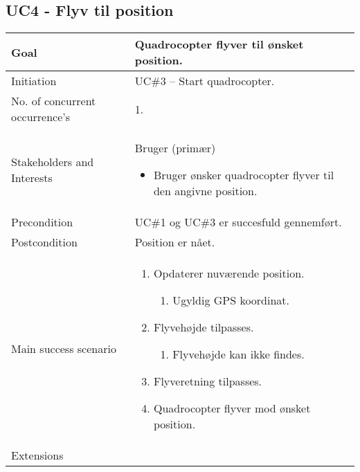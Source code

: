 \subsection*{UC4 - Flyv til position}

\begin{table}[H]
\begin{tabular}{|l|p{10cm}|}
\hline

Goal	 								& Quadrocopter flyver til ønsket position. \\\hline
Initiation 							& UC\#3 – Start quadrocopter. \\\hline
No. of concurrent occurrence’s		& 1. \\\hline
Stakeholders	and Interests			& Bruger (primær) 
										\begin{itemize}
											\item Bruger ønsker quadrocopter flyver til den angivne position.
										\end{itemize} \\\hline
Precondition							& UC\#1 og UC\#3 er succesfuld gennemført. \\\hline
Postcondition						& Position er nået. \\\hline
Main success scenario				&
 
									\renewcommand{\labelenumi}{\arabic{enumi}.}
									\renewcommand{\labelenumii}{\Roman{enumii}:}

									\begin{enumerate}[topsep=0.0cm, leftmargin=0.5cm]
										\item Opdaterer nuværende position.
											\begin{enumerate}[partopsep=4cm, topsep=0cm, leftmargin=1cm]
												\item Ugyldig GPS koordinat.
											\end{enumerate}
										\item Flyvehøjde tilpasses.
											\begin{enumerate}[partopsep=4cm, topsep=0cm, leftmargin=1cm]
												\item Flyvehøjde kan ikke findes.
											\end{enumerate}
										\item Flyveretning tilpasses.
										\item Quadrocopter flyver mod ønsket position.
									\end{enumerate} \\\hline	

Extensions							& 


\end{tabular}
\end{table}
